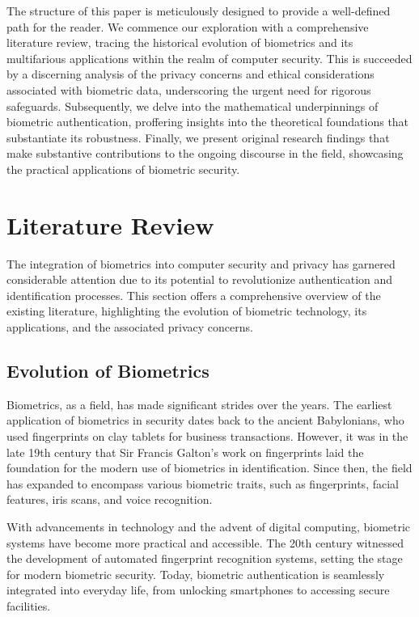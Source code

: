 \documentclass{IEEEtran}
\begin{document}
The structure of this paper is meticulously designed to provide a well-defined path for the reader. We commence our exploration with a comprehensive literature review, tracing the historical evolution of biometrics and its multifarious applications within the realm of computer security. This is succeeded by a discerning analysis of the privacy concerns and ethical considerations associated with biometric data, underscoring the urgent need for rigorous safeguards. Subsequently, we delve into the mathematical underpinnings of biometric authentication, proffering insights into the theoretical foundations that substantiate its robustness. Finally, we present original research findings that make substantive contributions to the ongoing discourse in the field, showcasing the practical applications of biometric security.

\section{Literature Review}
The integration of biometrics into computer security and privacy has garnered considerable attention due to its potential to revolutionize authentication and identification processes. This section offers a comprehensive overview of the existing literature, highlighting the evolution of biometric technology, its applications, and the associated privacy concerns.

\subsection{Evolution of Biometrics}
Biometrics, as a field, has made significant strides over the years. The earliest application of biometrics in security dates back to the ancient Babylonians, who used fingerprints on clay tablets for business transactions. However, it was in the late 19th century that Sir Francis Galton's work on fingerprints laid the foundation for the modern use of biometrics in identification. Since then, the field has expanded to encompass various biometric traits, such as fingerprints, facial features, iris scans, and voice recognition.

With advancements in technology and the advent of digital computing, biometric systems have become more practical and accessible. The 20th century witnessed the development of automated fingerprint recognition systems, setting the stage for modern biometric security. Today, biometric authentication is seamlessly integrated into everyday life, from unlocking smartphones to accessing secure facilities.
\end{document}
